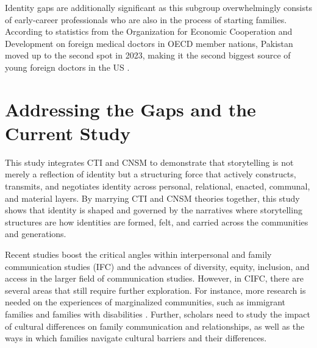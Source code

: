 Identity gaps are additionally significant as this subgroup overwhelmingly consists of early-career professionals who are also in the process of starting families. According to statistics from the Organization for Economic Cooperation and Development on foreign medical doctors in OECD member nations, Pakistan moved up to the second spot in 2023, making it the second biggest source of young foreign doctors in the US \citep{mullanMetricsPhysicianBrain2005, haqPakistanSecondBiggest2023}.

\section{Addressing the Gaps and the Current Study}

This study integrates CTI and CNSM to demonstrate that storytelling is not merely a reflection of identity but a structuring force that actively constructs, transmits, and negotiates identity across personal, relational, enacted, communal, and material layers. By marrying CTI and CNSM theories together, this study shows that identity is shaped and governed by the narratives where storytelling structures are how identities are formed, felt, and carried across the communities and generations. 

Recent studies boost the critical angles within interpersonal and family communication studies (IFC) and the advances of diversity, equity, inclusion, and access in the larger field of communication studies. However, in CIFC, there are several areas that still require further exploration. For instance, more research is needed on the experiences of marginalized communities, such as immigrant families and families with disabilities \citep{faulknerSettingAgendaPoetic2023, manningHammerCriticalTurn2021, mooreWhatCountsCritical2019}. Further, scholars need to study the impact of cultural differences on family communication and relationships, as well as the ways in which families navigate cultural barriers and their differences. 

